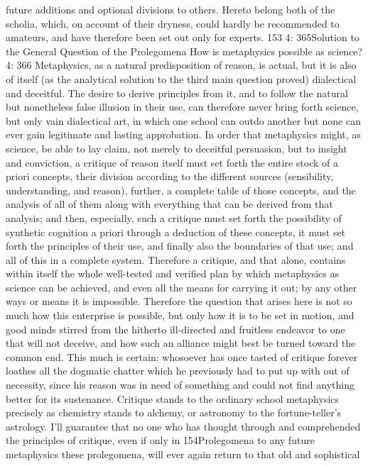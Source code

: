 future additions and optional divisions to others. Hereto belong both of the
scholia, which, on account of their dryness, could hardly be recommended to
amateurs, and have therefore been set out only for experts.
153
4: 365Solution
to the General Question
of the Prolegomena
How is metaphysics possible as science?
4: 366
Metaphysics, as a natural predisposition of reason, is actual, but it is also
of itself (as the analytical solution to the third main question proved)
dialectical and deceitful. The desire to derive principles from it, and to
follow the natural but nonetheless false illusion in their use, can therefore
never bring forth science, but only vain dialectical art, in which one
school can outdo another but none can ever gain legitimate and lasting
approbation.
In order that metaphysics might, as science, be able to lay claim, not
merely to deceitful persuasion, but to insight and conviction, a critique
of reason itself must set forth the entire stock of a priori concepts, their
division according to the different sources (sensibility, understanding,
and reason), further, a complete table of those concepts, and the analysis
of all of them along with everything that can be derived from that analysis;
and then, especially, such a critique must set forth the possibility of
synthetic cognition a priori through a deduction of these concepts, it
must set forth the principles of their use, and ﬁnally also the boundaries
of that use; and all of this in a complete system. Therefore a critique, and
that alone, contains within itself the whole well-tested and veriﬁed plan
by which metaphysics as science can be achieved, and even all the means
for carrying it out; by any other ways or means it is impossible. Therefore
the question that arises here is not so much how this enterprise is possible,
but only how it is to be set in motion, and good minds stirred from the
hitherto ill-directed and fruitless endeavor to one that will not deceive,
and how such an alliance might best be turned toward the common end.
This much is certain: whosoever has once tasted of critique forever
loathes all the dogmatic chatter which he previously had to put up with
out of necessity, since his reason was in need of something and could not
ﬁnd anything better for its sustenance. Critique stands to the ordinary
school metaphysics precisely as chemistry stands to alchemy, or astronomy
to the fortune-teller’s astrology. I’ll guarantee that no one who has thought
through and comprehended the principles of critique, even if only in
154Prolegomena to any future metaphysics
these prolegomena, will ever again return to that old and sophistical
